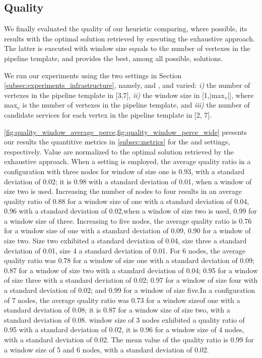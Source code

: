 \subsection{Quality}\label{subsec:experiments_quality}
We finally evaluated the quality of our heuristic comparing, where possible, its results with the optimal solution retrieved by executing the exhaustive approach. The latter is executed with window size equals to the number of vertexes in the pipeline template, and provides the best, among all possible, solutions.

We run our experiments using the two settings in Section \cref{subsec:experiments_infrastructure}, namely, \average and \wide,  and varied: \emph{i)} the number of vertexes in the pipeline template in [3,7], \emph{ii)} the window size in [1,$|$max$_v$$|$], where max$_v$ is the number of vertexes in the pipeline template, and \emph{iii)} the number of candidate services for each vertex in the pipeline template in [2, 7].


\cref{fig:quality_window_average_perce,fig:quality_window_perce_wide} presents our results the quantitive metrics in \cref{subsec:metrics} for the \wide and \average settings, respectively.
Value are normalized to the optimal solution retrieved by the exhaustive approach.
%
When a \wide setting is employed, the average quality ratio in a configuration with three nodes for window of size one is 0.93, with a standard deviation of 0.02; it is 0.98 with a standard deviation of 0.01, when a window of size two is used. Increasing the number of nodes to four results in an average quality ratio of 0.88 for a window size of one with a standard deviation of 0.04, 0.96 with a standard deviation of 0.02,when a window of size two is used, 0.99 for a window size of three. Increasing to five nodes, the average quality ratio is 0.76 for a window size of one with a standard deviation of 0.09, 0.90 for a window of size two. Size two exhibited a standard deviation of 0.04, size three a standard deviation of 0.01, size 4 a standard deviation of 0.01.
For 6 nodes, the average quality ratio was 0.78 for a window of size one with a standard deviation of 0.09; 0.87 for a window of size two with a standard deviation of 0.04; 0.95 for a window of size three with a standard deviation of 0.02; 0.97 for a window of size four with a standard deviation of 0.02; and 0.99 for a window of size five.In a configuration of 7 nodes, the average quality ratio was 0.73 for a window sizeof one with a standard deviation of 0.08; it is 0.87 for a window size of size two, with a standard deviation of 0.08.  window size of 3 nodes exhibited a quality ratio of 0.95  with a standard deviation of 0.02, it is 0.96 for a window size of 4 nodes, with a standard deviation of 0.02. The mean value of the quality ratio is 0.99 for a window size of 5 and 6 nodes, with a standard deviation of 0.02.


